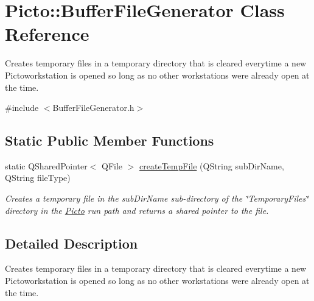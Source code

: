 \hypertarget{class_picto_1_1_buffer_file_generator}{\section{Picto\-:\-:Buffer\-File\-Generator Class Reference}
\label{class_picto_1_1_buffer_file_generator}
}


Creates temporary files in a temporary directory that is cleared everytime a new Pictoworkstation is opened so long as no other workstations were already open at the time.  




{\ttfamily \#include $<$Buffer\-File\-Generator.\-h$>$}

\subsection*{Static Public Member Functions}
\begin{DoxyCompactItemize}
\item 
\hypertarget{class_picto_1_1_buffer_file_generator_afa04c82713737e28dc38e0d6d28445d1}{static Q\-Shared\-Pointer$<$ Q\-File $>$ \hyperlink{class_picto_1_1_buffer_file_generator_afa04c82713737e28dc38e0d6d28445d1}{create\-Temp\-File} (Q\-String sub\-Dir\-Name, Q\-String file\-Type)}\label{class_picto_1_1_buffer_file_generator_afa04c82713737e28dc38e0d6d28445d1}

\begin{DoxyCompactList}\small\item\em Creates a temporary file in the sub\-Dir\-Name sub-\/directory of the \char`\"{}\-Temporary\-Files\char`\"{} directory in the \hyperlink{namespace_picto}{Picto} run path and returns a shared pointer to the file. \end{DoxyCompactList}\end{DoxyCompactItemize}


\subsection{Detailed Description}
Creates temporary files in a temporary directory that is cleared everytime a new Pictoworkstation is opened so long as no other workstations were already open at the time. 


